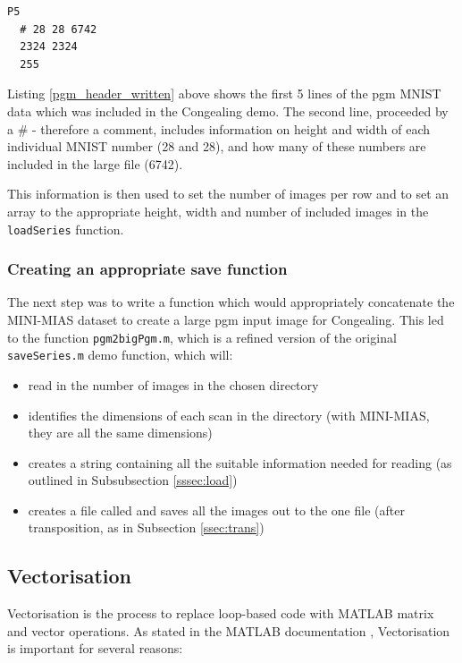\begin{lstlisting}[style=Matlab-editor,frame=single,label=pgm_header_written, caption=Example MNIST PGM file header]
  P5
  # 28 28 6742
  2324 2324
  255
\end{lstlisting}


Listing \ref{pgm_header_written} above shows the first 5 lines of the \acrshort{pgm} MNIST data which was included in the \Gls{Congealing} demo. The second line, proceeded by a \# - therefore a comment, includes information on height and width of each individual MNIST number (28 and 28), and how many of these numbers are included in the large file (6742).

This information is then used to set the number of images per row and to set an array to the appropriate height, width and number of included images in the \texttt{loadSeries} function.


\subsubsection{Creating an appropriate save function}

The next step was to write a function which would appropriately concatenate the MINI-MIAS dataset \cite{Suckling_1994} to create a large \acrshort{pgm} input image for \Gls{Congealing}. This led to the function \texttt{pgm2bigPgm.m}, which is a refined version of the original \texttt{saveSeries.m} demo function, which will:
\begin{itemize}
\item read in the number of images in the chosen directory
\item identifies the dimensions of each scan in the directory (with MINI-MIAS, they are all the same dimensions)
\item creates a string containing all the suitable information needed for reading (as outlined in Subsubsection \ref{sssec:load})
\item creates a file called  and saves all the images out to the one file (after transposition, as in Subsection \ref{ssec:trans})
\end{itemize}

\subsection{Vectorisation}

Vectorisation is the process to replace loop-based code with MATLAB matrix and vector operations. As stated in the MATLAB documentation \cite{vectorisation}, Vectorisation is important for several reasons:

